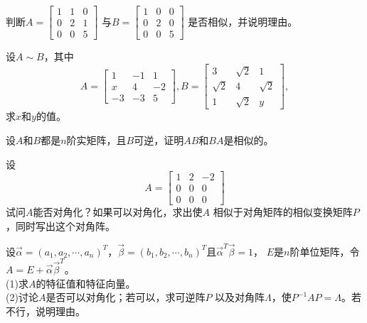 \begin{ex}\label{7.13}
判断$A=\begin{bmatrix}1&1&0\\0&2&1\\0&0&5\end{bmatrix}$
与$B=\begin{bmatrix}1&0&0\\0&2&0\\0&0&5\end{bmatrix}$ 是否相似，并说明理由。
\end{ex}

\begin{ex}\label{7.14}
设$A\sim B$，其中
\begin{equation*}
A=\begin{bmatrix}1&-1&1\\x&4&-2\\-3&-3&5\end{bmatrix},
B=\begin{bmatrix}3&\sqrt{2}&1\\ \sqrt{2}&4&\sqrt{2}\\1&\sqrt{2}&y\end{bmatrix},
\end{equation*}
求$x$和$y$的值。
\end{ex}

\begin{ex}\label{7.15}
设$A$和$B$都是$n$阶实矩阵，且$B$可逆，证明$AB$和$BA$是相似的。
\end{ex}

\begin{ex}\label{7.16}
设
\begin{equation*}
  A=\begin{bmatrix}1&2&-2\\0&0&0\\0&0&0\end{bmatrix}
\end{equation*}
试问$A$能否对角化？如果可以对角化，求出使$A$ 相似于对角矩阵的相似变换矩阵$P$，同时写出这个对角阵。
\end{ex}

\begin{ex}\label{7.17}
设$\vec{\alpha}=(a_1,a_2,\cdots,a_n)^T$，$\vec{\beta}=(b_1,b_2,\cdots,b_n)^T$且$\vec{\alpha}^T\vec{\beta}=1$，
$E$是$n$阶单位矩阵，令$A=E+\vec{\alpha}\vec{\beta}^T$。\\
(1)求$A$的特征值和特征向量。\\
(2)讨论$A$是否可以对角化；若可以，求可逆阵$P$ 以及对角阵$\Lambda$，使$P^{-1}AP=\Lambda$。若不行，说明理由。
\end{ex}

